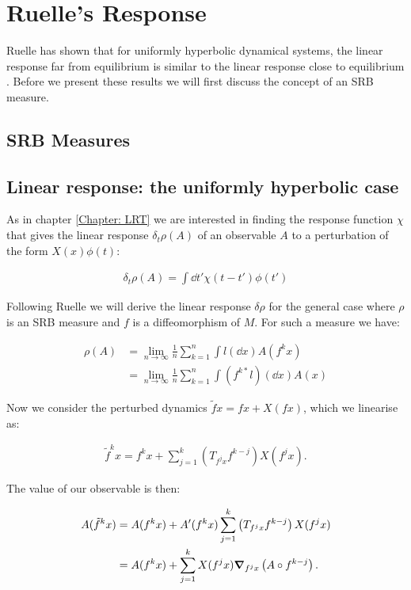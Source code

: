 \section{Ruelle's Response}
Ruelle has shown that for uniformly hyperbolic dynamical systems, the linear response far from equilibrium is similar to the linear response close to equilibrium \cite{Ruelle}. Before we present these results we will first discuss the concept of an SRB measure.

\subsection{SRB Measures}

\subsection{Linear response: the uniformly hyperbolic case}

As in chapter \ref{Chapter: LRT} we are interested in finding the response function $\chi$ that gives the linear response $\delta_t\rho (A)$ of an observable $A$ to a perturbation of the form $X(x)\phi(t)$:

\begin{align}
\delta_t \rho(A) = \int \dd t' \chi(t - t') \phi (t')
\end{align}

\noindent Following Ruelle \cite{Ruelle} we will derive the linear response $\delta \rho$ for the general case where $\rho$ is an SRB measure and $f$ is a diffeomorphism of $M$. For such a measure we have:

\begin{align}
\rho(A) &= \lim_{n \to \infty} \frac{1}{n} \sum_{k=1} ^n \int l( \dd x) A (f^k x)\\
&= \lim_{n \to \infty} \frac{1}{n} \sum_{k=1} ^n \int (f^{k*}l)( \dd x) A (x)
\end{align}

\noindent Now we consider the perturbed dynamics $\tilde{f} x = f x + X(fx)$, which we linearise as:

\begin{align}
\tilde{f}^kx = f^k x + \sum_{j = 1}^k \left(T_{f^j x} f^{k - j} \right) X(f^j x).
\end{align}

\noindent The value of our observable is then:

\begin{align}
A(\tilde{f}^k x) &= A(f^k x) + A'(f^k x) \sum_{j = 1}^k \left(T_{f^j x} f^{k - j} \right) X(f^j x)\\
&= A(f^k x) + \sum_{j=1} ^k X(f^j x) \grad_{f^j x} \left(A \circ f ^{k -j} \right).
\end{align}

